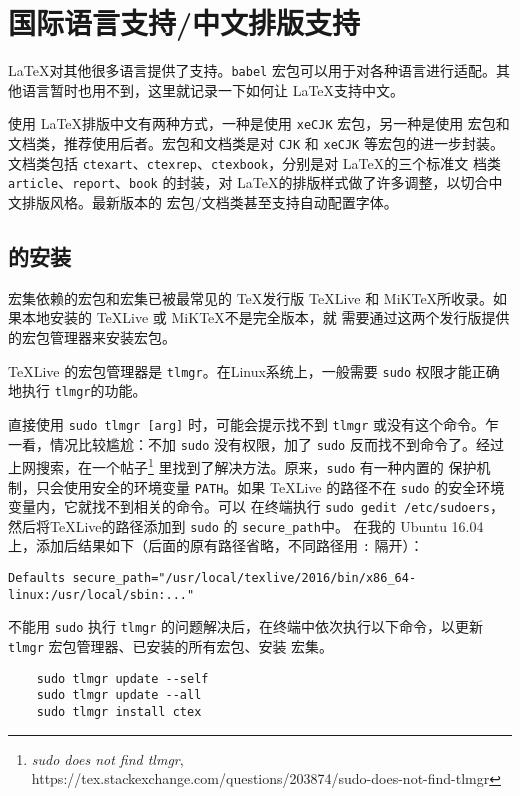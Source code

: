 \documentclass[UTF8]{ctexart}
\begin{document}
\section{国际语言支持/中文排版支持}
\LaTeX 对其他很多语言提供了支持。\texttt{babel} 宏包可以用于对各种语言进行适配。其他语言暂时也用不到，这里就记录一下如何让 \LaTeX 支持中文。

使用 \LaTeX 排版中文有两种方式，一种是使用 \texttt{xeCJK} 宏包，另一种是使用 \CTeX 宏包和文档类，推荐使用后者。\CTeX 宏包和文档类是对 \texttt{CJK}
和 \texttt{xeCJK} 等宏包的进一步封装。文档类包括 \texttt{ctexart}、\texttt{ctexrep}、\texttt{ctexbook}，分别是对 \LaTeX 的三个标准文
档类 \texttt{article}、\texttt{report}、\texttt{book} 的封装，对 \LaTeX 的排版样式做了许多调整，以切合中文排版风格。最新版本的 \CTeX
宏包/文档类甚至支持自动配置字体。

\subsection{\CTeX 的安装}
\CTeX 宏集依赖的宏包和宏集已被最常见的 \TeX 发行版 \TeX Live 和 MiK\TeX 所收录。如果本地安装的 \TeX Live 或 MiK\TeX 不是完全版本，就
需要通过这两个发行版提供的宏包管理器来安装宏包。

\TeX Live 的宏包管理器是 \texttt{tlmgr}。在Linux系统上，一般需要 \texttt{sudo} 权限才能正确地执行 \texttt{tlmgr}的功能。

直接使用 \texttt{sudo tlmgr [arg]} 时，可能会提示找不到 \texttt{tlmgr} 或没有这个命令。乍一看，情况比较尴尬：不加
\texttt{sudo} 没有权限，加了 \texttt{sudo} 反而找不到命令了。经过上网搜索，在一个帖子\footnote{\emph{sudo does not find tlmgr},
https://tex.stackexchange.com/questions/203874/sudo-does-not-find-tlmgr} 里找到了解决方法。原来，\texttt{sudo} 有一种内置的
保护机制，只会使用安全的环境变量 \texttt{PATH}。如果 \TeX Live 的路径不在 \texttt{sudo} 的安全环境变量内，它就找不到相关的命令。可以
在终端执行 \texttt{sudo gedit /etc/sudoers}，然后将\TeX Live的路径添加到 \texttt{sudo} 的 \texttt{secure\_path}中。
在我的 Ubuntu 16.04 上，添加后结果如下（后面的原有路径省略，不同路径用 \texttt{:} 隔开）：
\begin{verbatim}
Defaults secure_path="/usr/local/texlive/2016/bin/x86_64-linux:/usr/local/sbin:..."
\end{verbatim}

不能用 \texttt{sudo} 执行 \texttt{tlmgr} 的问题解决后，在终端中依次执行以下命令，以更新 \texttt{tlmgr} 宏包管理器、已安装的所有宏包、安装 \CTeX
宏集。
\begin{verbatim}
    sudo tlmgr update --self
    sudo tlmgr update --all
    sudo tlmgr install ctex
\end{verbatim}
\end{document}
